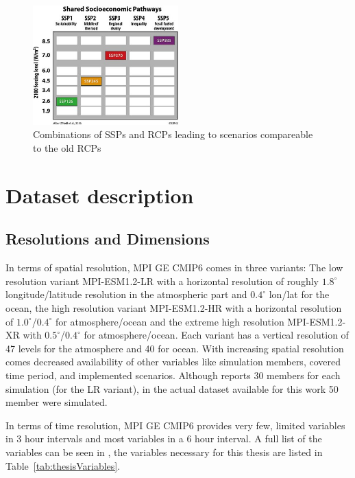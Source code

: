 \begin{figure}[bht]
  \begin{center}
    \includegraphics[width=0.5\textwidth]{figures/ssp_rcp_matrix.jpeg}
  \end{center}
  \caption{Combinations of SSPs and RCPs leading to scenarios compareable to the old RCPs \cite{bottinger_michael_ssp_nodate}}
  \label{fig:ssprcp}
\end{figure}


\section{Dataset description}




\subsection{Resolutions and Dimensions}
\label{sec:dataset-description}

In terms of spatial resolution, MPI GE CMIP6 comes in three variants: The low resolution variant MPI-ESM1.2-LR with a horizontal resolution of roughly $1.8^\circ$ longitude/latitude resolution in the atmospheric part and $0.4^\circ$ lon/lat for the ocean, the high resolution variant MPI-ESM1.2-HR with a horizontal resolution of $1.0^\circ$/$0.4^\circ$ for atmosphere/ocean and the extreme high resolution MPI-ESM1.2-XR with $0.5^\circ$/$0.4^\circ$ for atmosphere/ocean. 
Each variant has a vertical resolution of 47 levels for the atmosphere and 40 for ocean.
With increasing spatial resolution comes decreased availability of other variables like simulation members, covered time period, and implemented scenarios. 
Although \cite{olonscheck_new_2023} reports 30 members for each simulation (for the LR variant), in the actual dataset available for this work 50 member were simulated. 

In terms of time resolution, MPI GE CMIP6 provides very few, limited variables in 3 hour intervals and most variables in a 6 hour interval.  
A full list of the variables can be seen in \cite[Table 3]{olonscheck_new_2023}, the variables necessary for this thesis are listed in Table~\ref{tab:thesisVariables}. 

